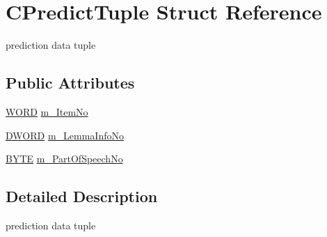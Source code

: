 \hypertarget{structCPredictTuple}{\section{C\-Predict\-Tuple Struct Reference}
\label{structCPredictTuple}
}


prediction data tuple  


\subsection*{Public Attributes}
\begin{DoxyCompactItemize}
\item 
\hyperlink{sphinxstd_8h_a197942eefa7db30960ae396d68339b97}{W\-O\-R\-D} \hyperlink{structCPredictTuple_a2889159389cf2c0a7fdc2306dab9d0d3}{m\-\_\-\-Item\-No}
\item 
\hyperlink{sphinxstd_8h_a798af1e30bc65f319c1a246cecf59e39}{D\-W\-O\-R\-D} \hyperlink{structCPredictTuple_aad6320cb77c45c7c2531c0a7303a5fc4}{m\-\_\-\-Lemma\-Info\-No}
\item 
\hyperlink{sphinxstd_8h_a4ae1dab0fb4b072a66584546209e7d58}{B\-Y\-T\-E} \hyperlink{structCPredictTuple_ad215007814a0444b111526131fb5c294}{m\-\_\-\-Part\-Of\-Speech\-No}
\end{DoxyCompactItemize}


\subsection{Detailed Description}
prediction data tuple 

